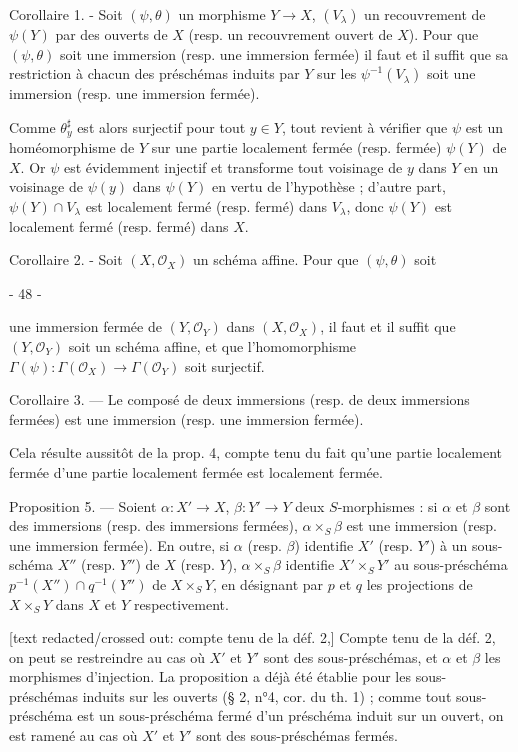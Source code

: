 Corollaire 1. - Soit $(\psi, \theta)$ un morphisme $Y \to X$, $(V_\lambda)$ un recouvrement de $\psi(Y)$ par des ouverts de $X$ (resp. un recouvrement ouvert de $X$). Pour que $(\psi, \theta)$ soit une immersion (resp. une immersion fermée) il faut et il suffit que sa restriction à chacun des préschémas induits par $Y$ sur les $\psi^{-1}(V_\lambda)$ soit une immersion (resp. une immersion fermée).

Comme $\theta_y^\sharp$ est alors surjectif pour tout $y \in Y$, tout revient à vérifier que $\psi$ est un homéomorphisme de $Y$ sur une partie localement fermée (resp. fermée) $\psi(Y)$ de $X$. Or $\psi$ est évidemment injectif et transforme tout voisinage de $y$ dans $Y$ en un voisinage de $\psi(y)$ dans $\psi(Y)$ en vertu de l'hypothèse ; d'autre part, $\psi(Y) \cap V_\lambda$ est localement fermé (resp. fermé) dans $V_\lambda$, donc $\psi(Y)$ est localement fermé (resp. fermé) dans $X$.

Corollaire 2. - Soit $(X, \mathcal{O}_X)$ un schéma affine. Pour que $(\psi, \theta)$ soit

\newpage


- 48 -

une immersion fermée de $(Y, \mathcal{O}_Y)$ dans $(X, \mathcal{O}_X)$, il faut et il suffit que $(Y, \mathcal{O}_Y)$ soit un schéma affine, et que l'homomorphisme $\Gamma(\psi) : \Gamma(\mathcal{O}_X) \to \Gamma(\mathcal{O}_Y)$ soit surjectif.

Corollaire 3. — Le composé de deux immersions (resp. de deux immersions fermées) est une immersion (resp. une immersion fermée).

Cela résulte aussitôt de la prop. 4, compte tenu du fait qu'une partie localement fermée d'une partie localement fermée est localement fermée.

Proposition 5. — Soient $\alpha : X' \to X$, $\beta : Y' \to Y$ deux $S$-morphismes : si $\alpha$ et $\beta$ sont des immersions (resp. des immersions fermées), $\alpha \times_S \beta$ est une immersion (resp. une immersion fermée). En outre, si $\alpha$ (resp. $\beta$) identifie $X'$ (resp. $Y'$) à un sous-schéma $X''$ (resp. $Y''$) de $X$ (resp. $Y$), $\alpha \times_S \beta$ identifie $X' \times_S Y'$ au sous-préschéma $p^{-1}(X'') \cap q^{-1}(Y'')$ de $X \times_S Y$, en désignant par $p$ et $q$ les projections de $X \times_S Y$ dans $X$ et $Y$ respectivement.

[text redacted/crossed out: compte tenu de la déf. 2,] Compte tenu de la déf. 2, on peut se restreindre au cas où $X'$ et $Y'$ sont des sous-préschémas, et $\alpha$ et $\beta$ les morphismes d'injection. La proposition a déjà été établie pour les sous-préschémas induits sur les ouverts (§ 2, n°4, cor. du th. 1) ; comme tout sous-préschéma est un sous-préschéma fermé d'un préschéma induit sur un ouvert, on est ramené au cas où $X'$ et $Y'$ sont des sous-préschémas fermés.

